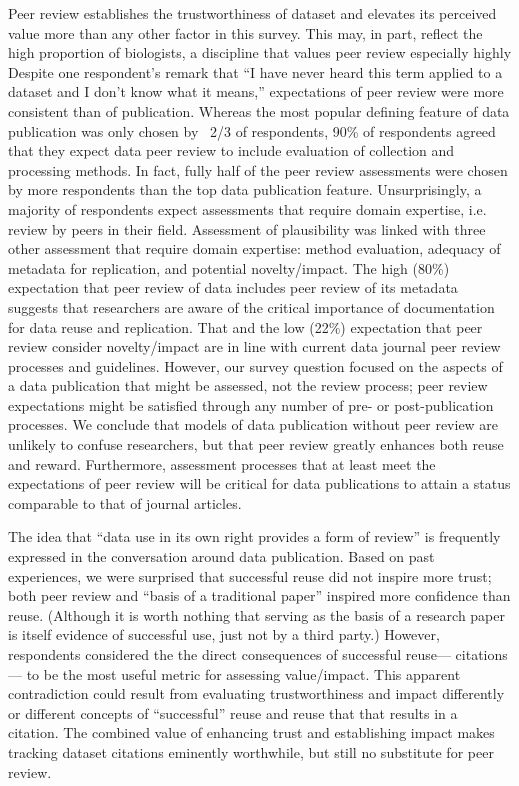 \documentclass[10pt]{article}
\begin{document}
Peer review establishes the trustworthiness of dataset and elevates its perceived value more than any other factor in this survey.
This may, in part, reflect the high proportion of biologists, a discipline that values peer review especially highly\cite{harley_assessing_2010} %
Despite one respondent's remark that ``I have never heard this term applied to a dataset and I don't know what it means,'' expectations of peer review were more consistent than of publication. 
Whereas the most popular defining feature of data publication was only chosen by ~2/3 of respondents, 90\% of respondents agreed that they expect data peer review to include evaluation of collection and processing methods.
In fact, fully half of the peer review assessments were chosen by more respondents than the top data publication feature.
Unsurprisingly, a majority of respondents expect assessments that require domain expertise, i.e. review by peers in their field.
Assessment of plausibility was linked with three other assessment that require domain expertise: method evaluation, adequacy of metadata for replication, and potential novelty/impact.
The high (80\%) expectation that peer review of data includes peer review of its metadata suggests that researchers are aware of the critical importance of documentation for data reuse and replication.
That and the low (22\%) expectation that peer review consider novelty/impact are in line with current data journal peer review processes and guidelines\cite{kratz_data_2014}.
However, our survey question focused on the aspects of a data publication that might be assessed, not the review process; peer review expectations might be satisfied through any number of pre- or post-publication processes.
We conclude that models of data publication without peer review are unlikely to confuse researchers, but that peer review greatly enhances both reuse and reward.
Furthermore, assessment processes that at least meet the expectations of peer review will be critical for data publications to attain a status comparable to that of journal articles.

The idea that ``data use in its own right provides a form of review''\cite{parsons_data_2010} is frequently expressed in the conversation around data publication. 
Based on past experiences, we were surprised that successful reuse did not inspire more trust; both peer review and ``basis of a traditional paper'' inspired more confidence than reuse.
(Although it is worth nothing that serving as the basis of a research paper is itself evidence of successful use, just not by a third party.)
However, respondents considered the the direct consequences of successful reuse--- citations--- to be the most useful metric for assessing value/impact.
This apparent contradiction could result from evaluating trustworthiness and impact differently or different concepts of  ``successful'' reuse and reuse that that results in a citation.
The combined value of enhancing trust and establishing impact makes tracking dataset citations eminently worthwhile, but still no substitute for peer review.
\end{document}
